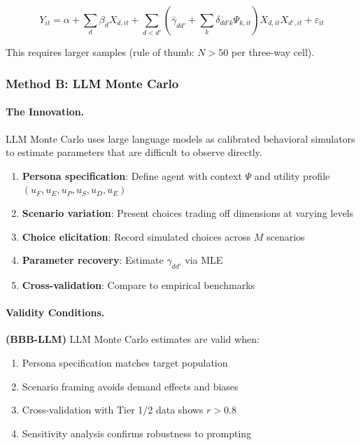 \begin{equation}
Y_{it} = \alpha + \sum_d \beta_d X_{d,it} + \sum_{d < d'} \left( \bar{\gamma}_{dd'} + \sum_k \delta_{dd'k} \Psi_{k,it} \right) X_{d,it} X_{d',it} + \varepsilon_{it}
\end{equation}

This requires larger samples (rule of thumb: $N > 50$ per three-way cell).

\subsubsection{Method B: LLM Monte Carlo}

\paragraph{The Innovation.}

LLM Monte Carlo uses large language models as calibrated behavioral simulators 
to estimate parameters that are difficult to observe directly.

\begin{definition}
\label{def:llm-mc}
\begin{enumerate}
    \item \textbf{Persona specification}: Define agent with context $\Psi$ and 
    utility profile $(u_F, u_E, u_P, u_S, u_D, u_E)$
    \item \textbf{Scenario variation}: Present choices trading off dimensions 
    at varying levels
    \item \textbf{Choice elicitation}: Record simulated choices across $M$ scenarios
    \item \textbf{Parameter recovery}: Estimate $\gamma_{dd'}$ via MLE
    \item \textbf{Cross-validation}: Compare to empirical benchmarks
\end{enumerate}
\end{definition}

\paragraph{Validity Conditions.}

\begin{axiom}
\label{ax:bbb-llm}
\textbf{(BBB-LLM)} LLM Monte Carlo estimates are valid when:
\begin{enumerate}
    \item Persona specification matches target population
    \item Scenario framing avoids demand effects and biases
    \item Cross-validation with Tier 1/2 data shows $r > 0.8$
    \item Sensitivity analysis confirms robustness to prompting
\end{enumerate}
\end{axiom}

